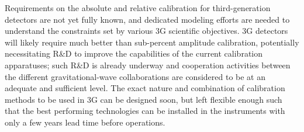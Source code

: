 Requirements on the absolute and relative calibration for third-generation detectors are not yet fully known, and dedicated modeling efforts are needed to understand the constraints set by various 3G scientific objectives. 3G detectors will likely require much better than sub-percent amplitude calibration, potentially necessitating R\&D to improve the capabilities of the current calibration apparatuses; such R\&D is already underway and cooperation activities between the different gravitational-wave collaborations are considered to be at an adequate and sufficient level.
The exact nature and combination of calibration methods to be used in 3G can be designed soon, but left flexible enough such that the best performing technologies can be installed in the instruments with only a few years lead time before operations.